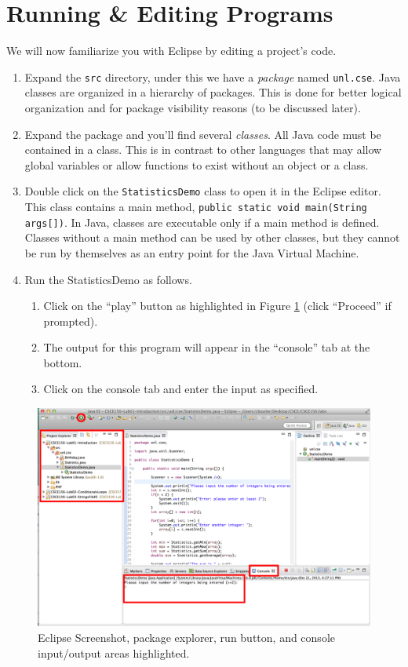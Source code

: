 \documentclass[12pt]{scrartcl}
\begin{document}
\section{Running \& Editing Programs}
\label{section:javaPart}

We will now familiarize you with Eclipse by editing a project's code.

\begin{enumerate}
  \item Expand the \texttt{src} directory, under this we have
  	a \emph{package} named \texttt{unl.cse}.  Java classes are 
	organized in a hierarchy of packages.  This is done for better logical 
	organization and for package visibility reasons (to be discussed later).
  \item Expand the package and you'll find several \emph{classes}.  
  	All Java code must be contained in a class.  This is in contrast 
	to other languages that may allow global variables or allow functions
	to exist without an object or a class.
  \item Double click on the \texttt{StatisticsDemo} class 
  	to open it in the Eclipse editor.  This class contains a main method, 
	\texttt{public static void main(String args[])}.
	In Java, classes are executable only if a main method is defined.  
	Classes without a main method can be used by other classes, but 
	they cannot be run by themselves as an entry point for the Java 
	Virtual Machine.  
  \item Run the StatisticsDemo as follows.
  \begin{enumerate}
    \item Click on the ``play'' button as highlighted in Figure \ref{figure:eclipseScreen} (click ``Proceed'' if prompted).
    \item The output for this program will appear in the 
    ``console'' tab at the bottom.
    \item Click on the console tab and enter the input as 
    specified.
  \end{enumerate}
\end{enumerate}

\begin{figure}[h]
\centering
\includegraphics[scale=.35]{images/eclipseScreen}
\caption{Eclipse Screenshot, package explorer, run button, and console
input/output areas highlighted.}
\label{figure:eclipseScreen}
\end{figure}
\end{document}
